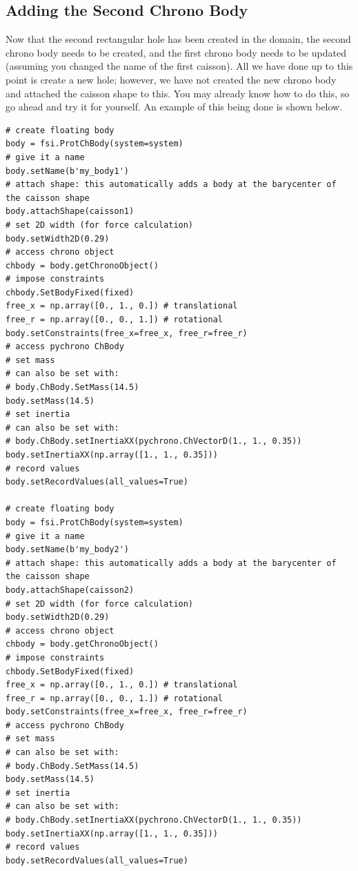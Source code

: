 \documentclass{report}
\begin{document}
\subsection{Adding the Second Chrono Body}
Now that the second rectangular hole has been created in the domain, the second chrono body needs to be created, and the first chrono body needs to be updated (assuming you changed the name of the first caisson). All we have done up to this point is create a new hole; however, we have not created the new chrono body and attached the caisson shape to this. You may already know how to do this, so go ahead and try it for yourself. An example of this being done is shown below.
\lstset{language=Python}
\lstset{frame=lines}
\lstset{basicstyle=\footnotesize}
\begin{lstlisting}
# create floating body
body = fsi.ProtChBody(system=system)
# give it a name
body.setName(b'my_body1')
# attach shape: this automatically adds a body at the barycenter of the caisson shape
body.attachShape(caisson1)
# set 2D width (for force calculation)
body.setWidth2D(0.29)
# access chrono object
chbody = body.getChronoObject()
# impose constraints
chbody.SetBodyFixed(fixed)
free_x = np.array([0., 1., 0.]) # translational
free_r = np.array([0., 0., 1.]) # rotational
body.setConstraints(free_x=free_x, free_r=free_r)
# access pychrono ChBody
# set mass
# can also be set with:
# body.ChBody.SetMass(14.5)
body.setMass(14.5)
# set inertia
# can also be set with:
# body.ChBody.setInertiaXX(pychrono.ChVectorD(1., 1., 0.35))
body.setInertiaXX(np.array([1., 1., 0.35]))
# record values
body.setRecordValues(all_values=True)

# create floating body
body = fsi.ProtChBody(system=system)
# give it a name
body.setName(b'my_body2')
# attach shape: this automatically adds a body at the barycenter of the caisson shape
body.attachShape(caisson2)
# set 2D width (for force calculation)
body.setWidth2D(0.29)
# access chrono object
chbody = body.getChronoObject()
# impose constraints
chbody.SetBodyFixed(fixed)
free_x = np.array([0., 1., 0.]) # translational
free_r = np.array([0., 0., 1.]) # rotational
body.setConstraints(free_x=free_x, free_r=free_r)
# access pychrono ChBody
# set mass
# can also be set with:
# body.ChBody.SetMass(14.5)
body.setMass(14.5)
# set inertia
# can also be set with:
# body.ChBody.setInertiaXX(pychrono.ChVectorD(1., 1., 0.35))
body.setInertiaXX(np.array([1., 1., 0.35]))
# record values
body.setRecordValues(all_values=True)
\end{lstlisting}
\end{document}
